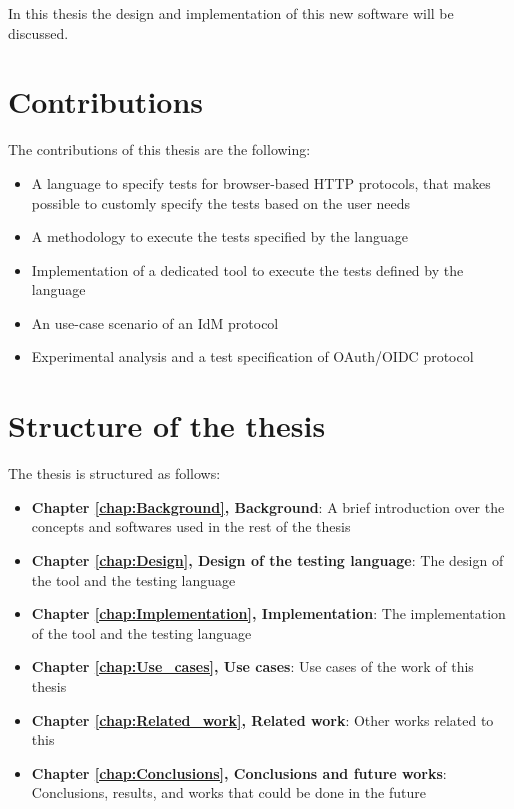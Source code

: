 In this thesis the design and implementation of this new software will be discussed.

\section{Contributions}
The contributions of this thesis are the following:
\begin{itemize}
    \item A language to specify tests for browser-based HTTP protocols, that makes possible to customly specify the tests based on the user needs
    \item A methodology to execute the tests specified by the language
    \item Implementation of a dedicated tool to execute the tests defined by the language
    \item An use-case scenario of an IdM protocol
    \item Experimental analysis and a test specification of OAuth/OIDC protocol
\end{itemize}

\section{Structure of the thesis}
The thesis is structured as follows:
\begin{itemize}
    \item \textbf{Chapter \ref{chap:Background}, Background}: A brief introduction over the concepts and softwares used in the rest of the thesis
    \item \textbf{Chapter \ref{chap:Design}, Design of the testing language}: The design of the tool and the testing language
    \item \textbf{Chapter \ref{chap:Implementation}, Implementation}: The implementation of the tool and the testing language
    \item \textbf{Chapter \ref{chap:Use_cases}, Use cases}: Use cases of the work of this thesis
    \item \textbf{Chapter \ref{chap:Related_work}, Related work}: Other works related to this
    \item \textbf{Chapter \ref{chap:Conclusions}, Conclusions and future works}: Conclusions, results, and works that could be done in the future
\end{itemize}




